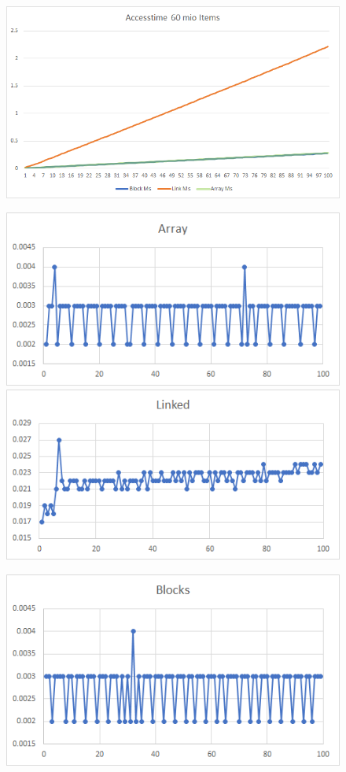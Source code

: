 \documentclass{TUBAFarbeiten}
\begin{document}
\begin{figure}[H]
\label{fig:Zugriff}
\includegraphics[scale=0.9]{Zugriff}

\includegraphics[scale=0.635]{ArrayVarriation}
\includegraphics[scale=0.635]{LinkVarriation}
\begin{center}
\includegraphics[scale=0.635]{BlockVarriation}
\end{center}
\end{figure}
\end{document}
